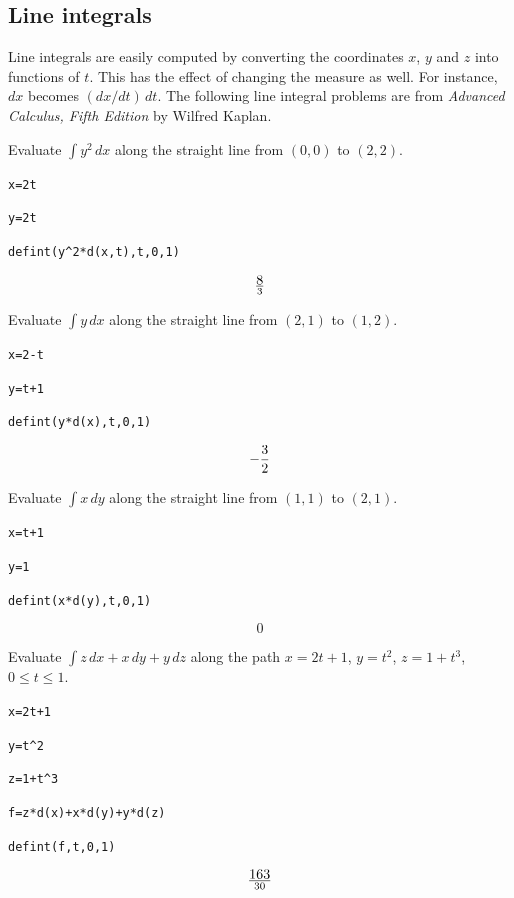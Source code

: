 \subsection{Line integrals}

Line integrals are easily computed by
converting the coordinates $x$, $y$ and $z$ into functions of $t$.
This has the effect of changing the measure as well.
For instance, $dx$ becomes $(dx/dt)\,dt$.
The following line integral problems are from
{\it Advanced Calculus, Fifth Edition} by Wilfred Kaplan.

\medskip
\noindent
Evaluate $\int y^2\,dx$ along the straight
line from $(0,0)$ to $(2,2)$.

\medskip
\verb$x=2t$

\verb$y=2t$

\verb$defint(y^2*d(x,t),t,0,1)$

$$8\over3$$

\medskip
\noindent
Evaluate $\int y\,dx$ along the straight line from
$(2,1)$ to $(1,2)$.

\medskip
\verb$x=2-t$

\verb$y=t+1$

\verb$defint(y*d(x),t,0,1)$

$$-{3\over2}$$

\medskip
\noindent
Evaluate $\int x\,dy$ along the straight line from
$(1,1)$ to $(2,1)$.

\medskip
\verb$x=t+1$

\verb$y=1$

\verb$defint(x*d(y),t,0,1)$

$$0$$

\medskip
\noindent
Evaluate $\int z\,dx+x\,dy+y\,dz$
along the path
$x=2t+1$, $y=t^2$, $z=1+t^3$, $0\le t\le 1$.

\medskip
\verb$x=2t+1$

\verb$y=t^2$

\verb$z=1+t^3$

\verb$f=z*d(x)+x*d(y)+y*d(z)$

\verb$defint(f,t,0,1)$

$$163\over30$$


